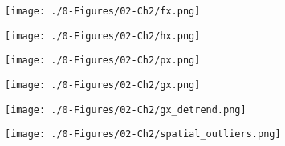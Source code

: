 \begin{figure}[!t]
    \begin{subfigure}{0.5\textwidth}
        \centering
        \texttt{[image: ./0-Figures/02-Ch2/fx.png]}
        \caption{}
        \label{fig:fx}
    \end{subfigure}
    \begin{subfigure}{0.5\textwidth}
        \centering
        \texttt{[image: ./0-Figures/02-Ch2/hx.png]}
        \caption{}
        \label{fig:hx}
    \end{subfigure}
    \begin{subfigure}{0.5\textwidth}
        \centering
        \texttt{[image: ./0-Figures/02-Ch2/px.png]}
        \caption{}
        \label{fig:px}
    \end{subfigure}
    \begin{subfigure}{0.5\textwidth}
        \centering
        \texttt{[image: ./0-Figures/02-Ch2/gx.png]}
        \caption{}
        \label{fig:gx}
    \end{subfigure}
    \begin{subfigure}{0.5\textwidth}
        \centering
        \texttt{[image: ./0-Figures/02-Ch2/gx\_detrend.png]}
        \caption{}
        \label{fig:gx_detrend}
    \end{subfigure}
    \begin{subfigure}{0.5\textwidth}
        \centering
        \texttt{[image: ./0-Figures/02-Ch2/spatial\_outliers.png]}
        \caption{}
        \label{fig:spatial_outliers}
    \end{subfigure}
    \caption{}
    \label{fig:outliers_1d}
\end{figure}

